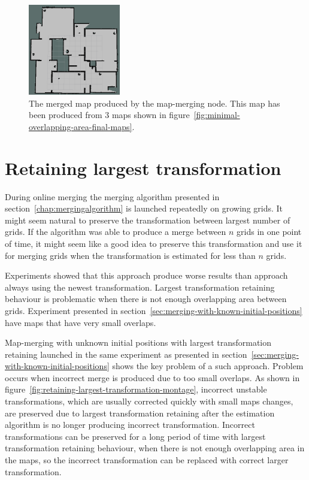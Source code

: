 \begin{figure}
    \centering
    \includegraphics[width=1.58in]{../img/minimal-overlapping-area-merged-map.png}
    \caption[The merged map produced by the map-merging node.]{The merged map produced by the map-merging node. This map has been produced from $3$ maps shown in figure~\ref{fig:minimal-overlapping-area-final-maps}.}
    \label{fig:minimal-overlapping-area-merged-map}
\end{figure}

\section{Retaining largest transformation}
\label{sec:retaining-largest-transformation}

During online merging the merging algorithm presented in section~\ref{chap:mergingalgorithm} is launched repeatedly on growing grids. It might seem natural to preserve the transformation between largest number of grids. If the algorithm was able to produce a merge between $n$ grids in one point of time, it might seem like a good idea to preserve this transformation and use it for merging grids when the transformation is estimated for less than $n$ grids.

Experiments showed that this approach produce worse results than approach always using the newest transformation. Largest transformation retaining behaviour is problematic when there is not enough overlapping area between grids. Experiment presented in section~\ref{sec:merging-with-known-initial-positions} have maps that have very small overlaps.

Map-merging with unknown initial positions with largest transformation retaining launched in the same experiment as presented in section~\ref{sec:merging-with-known-initial-positions} shows the key problem of a such approach. Problem occurs when incorrect merge is produced due to too small overlaps. As shown in figure~\ref{fig:retaining-largest-transformation-montage}, incorrect unstable transformations, which are usually corrected quickly with small maps changes, are preserved due to largest transformation retaining after the estimation algorithm is no longer producing incorrect transformation. Incorrect transformations can be preserved for a long period of time with largest transformation retaining behaviour, when there is not enough overlapping area in the maps, so the incorrect transformation can be replaced with correct larger transformation.

